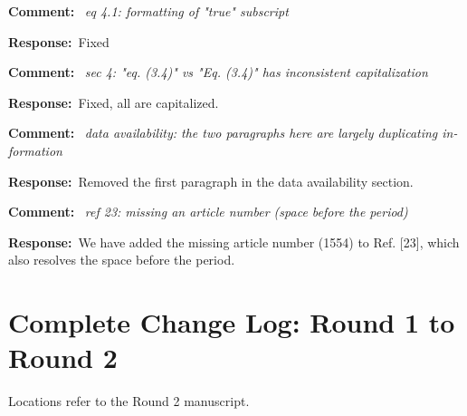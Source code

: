 \documentclass[11pt,a4paper]{article}
\newcommand{\refcomment}[1]{%
    \medskip\noindent\textbf{\color{refcolor}Comment:}\ %
    {\itshape #1}\par\smallskip
}
\newcommand{\response}{\noindent\textbf{Response:}\ }
\begin{document}
\refcomment{eq 4.1: formatting of "true" subscript}
\response Fixed

\refcomment{sec 4: "eq. (3.4)" vs "Eq. (3.4)" has inconsistent capitalization}
\response Fixed, all are capitalized.


\refcomment{data availability: the two paragraphs here are largely duplicating in-
formation}
\response Removed the first paragraph in the data availability section.

\refcomment{ref 23: missing an article number (space before the period)}
\response We have added the missing article number (1554) to Ref. [23], which also resolves the space before the period.

\clearpage

\section*{Complete Change Log: Round 1 to Round 2}

Locations refer to the Round 2 manuscript.
\end{document}
